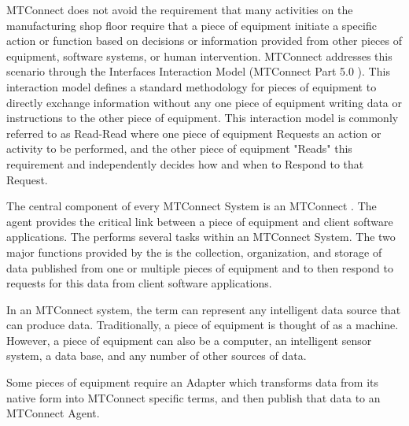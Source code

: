 MTConnect does not avoid the requirement that many activities on the manufacturing shop floor require that a piece of equipment initiate a specific action or function based on decisions or information provided from other pieces of equipment, software systems, or human intervention.   MTConnect addresses this scenario through the Interfaces Interaction Model (MTConnect Part 5.0 \cite{MTCPart5}).   This interaction model defines a standard methodology for pieces of equipment to directly exchange information without any one piece of equipment writing data or instructions to the other piece of equipment. This interaction model is commonly referred to as Read-Read where one piece of equipment Requests an action or activity to be performed, and the other piece of equipment "Reads" this requirement and independently decides how and when to Respond to that Request. 

The central component of every MTConnect System is an MTConnect .  The agent provides the critical link between a piece of equipment and client software applications. The  performs several tasks within an MTConnect System.   The two major functions provided by the  is the collection, organization, and storage of data published from one or multiple pieces of equipment and to then respond to requests for this data from client software applications. 


\FloatBarrier
 
In an MTConnect system, the term  can represent any intelligent data source that can produce data.  Traditionally, a piece of equipment is thought of as a machine. However, a piece of equipment can also be a computer, an intelligent sensor system, a data base, and any number of other sources of data. 
 
Some pieces of equipment require an Adapter which transforms data from its native form into MTConnect specific terms, and then publish that data to an MTConnect Agent.